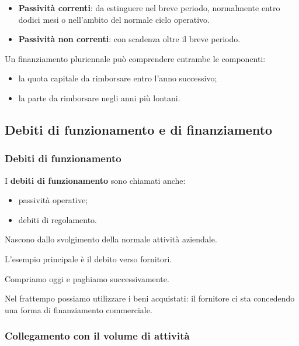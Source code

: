 \begin{itemize}
    \item \textbf{Passività correnti}:
    da estinguere nel breve periodo,
    normalmente entro dodici mesi
    o nell'ambito del normale ciclo operativo.

    \item \textbf{Passività non correnti}:
    con scadenza oltre il breve periodo.
\end{itemize}

\noindent Un finanziamento pluriennale
può comprendere entrambe le componenti:

\begin{itemize}
    \item la quota capitale da rimborsare
    entro l'anno successivo;

    \item la parte da rimborsare
    negli anni più lontani.
\end{itemize}


\subsection{Debiti di funzionamento e di finanziamento}

\subsubsection*{Debiti di funzionamento}

\noindent I \textbf{debiti di funzionamento}
sono chiamati anche:

\begin{itemize}
    \item passività operative;
    \item debiti di regolamento.
\end{itemize}

\noindent Nascono dallo svolgimento
della normale attività aziendale.

\noindent L'esempio principale
è il debito verso fornitori.

\medskip

\noindent Compriamo oggi
e paghiamo successivamente.

\noindent Nel frattempo possiamo utilizzare
i beni acquistati:
il fornitore ci sta concedendo
una forma di finanziamento commerciale.


\subsubsection*{Collegamento con il volume di attività}

